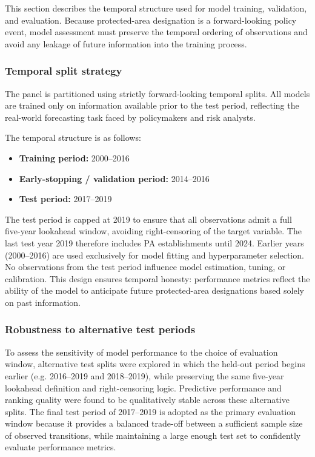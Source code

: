 \documentclass[12pt]{article}
\theoremstyle{break} %
\begin{document}
This section describes the temporal structure used for model training, validation, and evaluation. Because protected-area designation is a forward-looking policy event, model assessment must preserve the temporal ordering of observations and avoid any leakage of future information into the training process.

\subsubsection{Temporal split strategy}
\label{split}

The panel is partitioned using strictly forward-looking temporal splits. All models are trained only on information available prior to the test period, reflecting the real-world forecasting task faced by policymakers and risk analysts.

The temporal structure is as follows:
\begin{itemize}
    \item \textbf{Training period:} 2000--2016
    \item \textbf{Early-stopping / validation period:} 2014--2016
    \item \textbf{Test period:} 2017--2019
\end{itemize}

The test period is capped at 2019 to ensure that all observations admit a full five-year lookahead window, avoiding right-censoring of the target variable. The last test year 2019 therefore includes PA establishments until 2024. Earlier years (2000--2016) are used exclusively for model fitting and hyperparameter selection. No observations from the test period influence model estimation, tuning, or calibration. This design ensures temporal honesty: performance metrics reflect the ability of the model to anticipate future protected-area designations based solely on past information.

\subsubsection{Robustness to alternative test periods}
\label{robsutness}
To assess the sensitivity of model performance to the choice of evaluation window, alternative test splits were explored in which the held-out period begins earlier (e.g. 2016–2019 and 2018–2019), while preserving the same five-year lookahead definition and right-censoring logic. Predictive performance and ranking quality were found to be qualitatively stable across these alternative splits. The final test period of 2017–2019 is adopted as the primary evaluation window because it provides a balanced trade-off between a sufficient sample size of observed transitions, while maintaining a large enough test set to confidently evaluate performance metrics.
\end{document}
